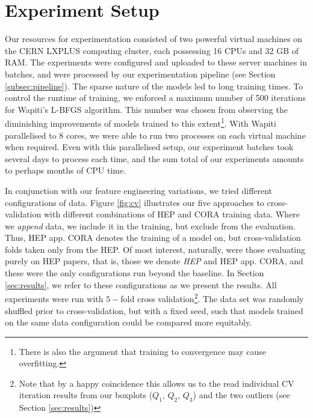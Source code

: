\section{Experiment Setup}
\label{sec:experimentsetup}

Our resources for experimentation consisted of two powerful virtual machines on the CERN LXPLUS computing cluster, each possessing 16 CPUs and 32 GB of RAM. The experiments were configured and uploaded to these server machines in batches, and were processed by our experimentation pipeline (see Section \ref{subsec:pipeline}). The sparse nature of the models led to long training times. To control the runtime of training, we enforced a maximum number of 500 iterations for Wapiti's L-BFGS algorithm. This number was chosen from observing the diminishing improvements of models trained to this extent\footnote{There is also the argument that training to convergence may cause overfitting.}. With Wapiti parallelised to 8 cores, we were able to run two processes on each virtual machine when required. Even with this parallelised setup, our experiment batches took several days to process each time, and the sum total of our experiments amounts to perhaps months of CPU time.

In conjunction with our feature engineering variations, we tried different configurations of data. Figure \ref{fig:cv} illustrates our five approaches to cross-validation with different combinations of HEP and CORA training data. Where we \emph{append} data, we include it in the training, but exclude from the evaluation. Thus, HEP app. CORA denotes the training of a model on, but cross-validation folds taken only from the HEP. Of most interest, naturally, were those evaluating purely on HEP papers, that is, those we denote \emph{HEP} and {HEP app. CORA}, and these were the only configurations run beyond the baseline. In Section \ref{sec:results}, we refer to these configurations as we present the results. All experiments were run with $5-$fold cross validation\footnote{Note that by a happy coincidence this allows us to the read individual CV iteration results from our boxplots ($Q_1$, $Q_2$, $Q_3$) and the two outliers (see Section \ref{sec:results})}. The data set was randomly shuffled prior to cross-validation, but with a fixed seed, such that models trained on the same data configuration could be compared more equitably. 

